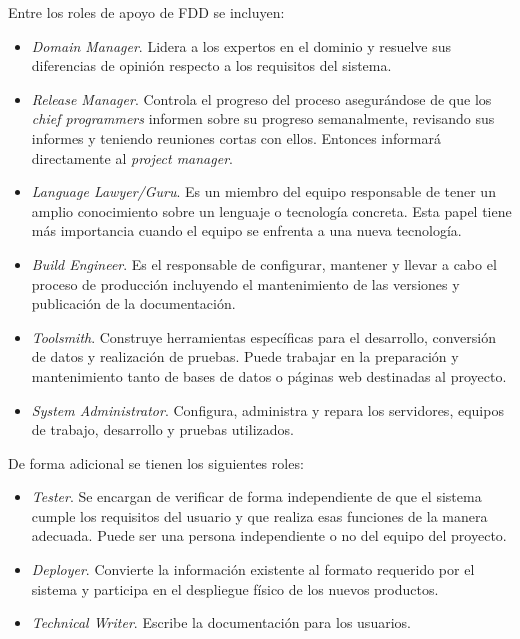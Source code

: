 \documentclass[11pt]{article}
\begin{document}
Entre los roles de apoyo de FDD se incluyen:

\begin{itemize}
\item \textit{Domain Manager}. Lidera a los expertos en el dominio y resuelve sus diferencias de opinión respecto a los requisitos del sistema.
\item \textit{Release Manager}. Controla el progreso del proceso asegurándose de que los \textit{chief programmers} informen sobre su progreso semanalmente, revisando sus informes y teniendo reuniones cortas con ellos. Entonces informará directamente al \textit{project manager}.
\item \textit{Language Lawyer/Guru}. Es un miembro del equipo responsable de tener un amplio conocimiento sobre un lenguaje o tecnología concreta. Esta papel tiene más importancia cuando el equipo se enfrenta a una nueva tecnología.
\item \textit{Build Engineer}. Es el responsable de configurar, mantener y llevar a cabo el proceso de producción incluyendo el mantenimiento de las versiones y publicación de la documentación.
\item \textit{Toolsmith}. Construye herramientas específicas para el desarrollo, conversión de datos y realización de pruebas. Puede trabajar en la preparación y mantenimiento tanto de bases de datos o páginas web destinadas al proyecto.
\item \textit{System Administrator}. Configura, administra y repara los servidores, equipos de trabajo, desarrollo y pruebas utilizados. 
\end{itemize}

De forma adicional se tienen los siguientes roles:

\begin{itemize}
\item \textit{Tester}. Se encargan de verificar de forma independiente de que el sistema cumple los requisitos del usuario y que realiza esas funciones de la manera adecuada. Puede ser una persona independiente o no del equipo del proyecto.
\item \textit{Deployer}. Convierte la información existente al formato requerido por el sistema y participa en el despliegue físico de los nuevos productos. 
\item \textit{Technical Writer}. Escribe la documentación para los usuarios.

\end{itemize}
\end{document}
